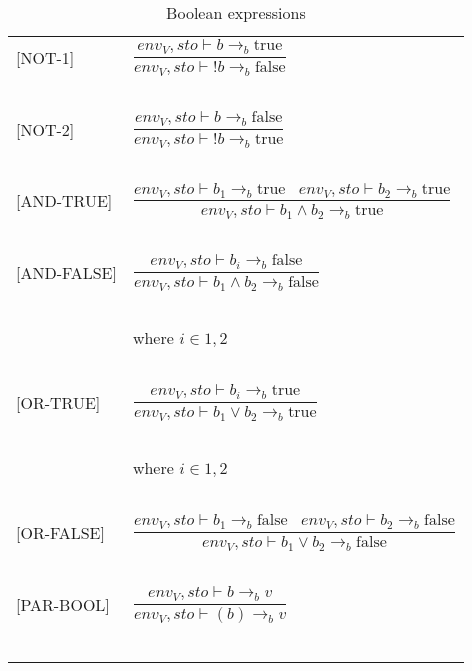 \begin{longtable}{l l}
[NOT-1] & $\dfrac{env_V, sto \vdash b \rightarrow_b \text{true}}{env_V, sto \vdash !b \rightarrow_b \text{false}}$ \\
~ & ~ \\

[NOT-2] & $\dfrac{env_V, sto \vdash b \rightarrow_b \text{false}}{env_V, sto \vdash !b \rightarrow_b \text{true}}$ \\
~ & ~ \\

[AND-TRUE] & $\dfrac{env_V, sto \vdash b_1 \rightarrow_b \text{true} \; \; \; env_V, sto \vdash b_2 \rightarrow_b \text{true}}{env_V, sto \vdash b_1 \wedge b_2 \rightarrow_b \text{true}}$ \\
~ & ~ \\

[AND-FALSE] & $\dfrac{env_V, sto \vdash b_i \rightarrow_b \text{false}}{env_V, sto \vdash b_1 \wedge b_2 \rightarrow_b \text{false}}$ \\
~ & ~ \\
~ & \indent\indent where $i \in {1,2}$ \\
~ & ~ \\

[OR-TRUE] & $\dfrac{env_V, sto \vdash b_i \rightarrow_b \text{true}}{env_V, sto \vdash b_1 \vee b_2 \rightarrow_b \text{true}}$ \\
~ & ~ \\
~ & \indent\indent where $i \in {1,2}$ \\
~ & ~ \\

[OR-FALSE] & $\dfrac{env_V, sto \vdash b_1 \rightarrow_b \text{false} \; \; \; env_V, sto \vdash b_2 \rightarrow_b \text{false}}{env_V, sto \vdash b_1 \vee b_2 \rightarrow_b \text{false}}$ \\
~ & ~ \\

[PAR-BOOL] & $\dfrac{env_V, sto \vdash b \rightarrow_b v}{env_V, sto \vdash (b) \rightarrow_b v}$ \\
~ & ~ \\
\caption{Boolean expressions}
\end{longtable}

